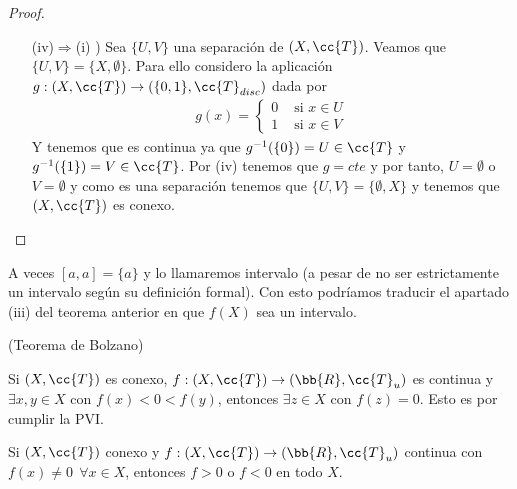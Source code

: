 \begin{teo}
\begin{proof}
\begin{itemize}
            \item[(iv)$\Rightarrow$(i) )] Sea $\{U,V\}$ una separación de $(X, \cc{T})$. Veamos que $\{U,V\}=\{X, \emptyset\}$. Para ello considero la aplicación $g:(X, \cc{T})\to (\{0,1\}, \cc{T}_{disc})$ dada por 
            \begin{align*}
                g(x)=\left\{
                    \begin{array}{ccc}
                        0 & \text{ si } x\in U\\
                        1 & \text{ si } x \in V
                    \end{array}
                \right.
            \end{align*}
            Y tenemos que es continua ya que $g^{-1}(\{0\})=U\in \cc{T}$ y $g^{-1}(\{1\})=V\in \cc{T}$. Por (iv) tenemos que $g=cte$ y por tanto, $U =\emptyset$ o $V=\emptyset$ y como es una separación tenemos que $\{U,V\}=\{\emptyset, X\}$ y tenemos que $(X, \cc{T})$ es conexo.
        \end{itemize}
    \end{proof}
\end{teo}

\begin{observacion}
    A veces $[a,a]=\{a\}$ y lo llamaremos intervalo (a pesar de no ser estrictamente un intervalo según su definición formal). Con esto podríamos traducir el apartado (iii) del teorema anterior en que $f(X)$ sea un intervalo.
    \endsquare
\end{observacion}

\begin{coro}
    (Teorema de Bolzano)
    
    Si $(X, \cc{T})$ es conexo, $f:(X, \cc{T})\to (\bb{R}, \cc{T}_u)$ es continua y $\exists x,y\in X$ con $f(x)<0<f(y)$, entonces $\exists z \in X$ con $f(z)=0$. Esto es por cumplir la PVI.
    \endsquare
\end{coro}

\begin{coro}
    Si $(X, \cc{T})$ conexo y $f:(X, \cc{T})\to (\bb{R}, \cc{T}_u)$ continua con $f(x)\neq 0\ \ \forall x \in X$, entonces $f>0$ o $f<0$ en todo $X$.
    \endsquare
\end{coro}

